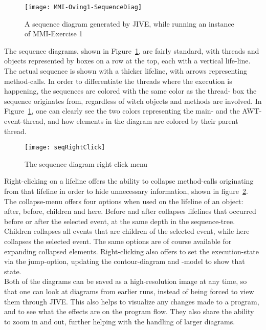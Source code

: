 \begin{figure}[H]
	\texttt{[image: MMI-Oving1-SequenceDiag]}
	\caption{A sequence diagram generated by JIVE, while running an instance of MMI-Exercise 1}
	\label{fig:oving1SeqDiag}
\end{figure}
The sequence diagrams, shown in Figure~\ref{fig:oving1SeqDiag}, are fairly standard, with threads and objects represented by boxes on a row at the top, each with a vertical life-line.
The actual sequence is shown with a thicker lifeline, with arrows representing method-calls.
In order to differentiate the threads where the execution is happening, the sequences are colored with the same color as the thread- box the sequence originates from, regardless of witch objects and methods are involved.
In Figure~\ref{fig:oving1SeqDiag}, one can clearly see the two colors representing the main- and the AWT-event-thread, and how elements in the diagram are colored by their parent thread.
\begin{figure}[H]
	\texttt{[image: seqRightClick]}
	\caption{The sequence diagram right click menu}
	\label{fig:seqRightClick}
\end{figure}
Right-clicking on a lifeline offers the ability to collapse method-calls originating from that lifeline in order to hide unnecessary information, shown in figure~\ref{fig:seqRightClick}.
The collapse-menu offers four options when used on the lifeline of an object: after, before, children and here.
Before and after collapses lifelines that occurred before or after the selected event, at the same depth in the sequence-tree.
Children collapses all events that are children of the selected event, while here collapses the selected event.%
The same options are of course available for expanding collapsed elements.
Right-clicking also offers to set the execution-state via the jump-option, updating the contour-diagram and -model to show that state.
~\\

Both of the diagrams can be saved as a high-resolution image at any time, so that one can look at diagrams from earlier runs, instead of being forced to view them through JIVE.
This also helps to visualize any changes made to a program, and to see what the effects are on the program flow.
They also share the ability to zoom in and out, further helping with the handling of larger diagrams.
~\\

